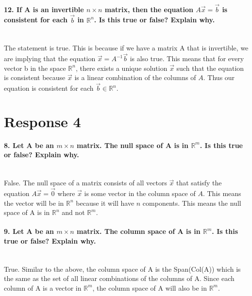 \documentclass{report}
\begin{document}
\paragraph{12. If A is an invertible $ n \times n $ matrix, then the equation $ A \vec{ x }= \vec{ b } $ is consistent for each $ \vec{ b }  $ in $ \mathbb{R}^{ n } $. Is this true or false? Explain why. \\ \\}
The statement is true. This is because if we have a matrix A that is invertible, we are implying that the equation $ \vec{ x } = A^{ -1 }\vec{ b } $ is also true. This means that for every vector b in the space $ \mathbb{R}^{ n } $, there exists a unique solution $ \vec{ x } $ such that the equation is consistent because $ \vec{ x } $ is a linear combination of the columns of $ A $. Thus our equation is consistent for each $ \vec{ b } \in \mathbb{R}^{ n }$.

\section{Response 4}%
\label{sec: Response 4 }
\paragraph{8. Let A be an $ m \times n $ matrix. The null space of A is in $ \mathbb{R}^{ m } $. Is this true or false? Explain why. \\ \\}
False. The null space of a matrix consists of all vectors $ \vec{ x } $ that satisfy the equation $ A \vec{ x } = \vec{ 0 } $ where $ \vec{ x } $ is some vector in the column space of $ A $. This means the vector will be in $ \mathbb{R}^{ n } $ because it will have $ n $ components. This means the null space of A is in $ \mathbb{R}^{ n } $ and not $ \mathbb{R}^{ m } $. 
\paragraph{9. Let A be an $ m \times n $ matrix. The column space of A is in $ \mathbb{R}^{ m } $. Is this true or false? Explain why. \\ \\}
True. Similar to the above, the column space of A is the Span(Col(A)) which is the same as the set of all linear combinations of the columns of A. Since each column of A is a vector in $ \mathbb{R}^{ m } $, the column space of A will also be in $ \mathbb{R}^{ m }$. 
\end{document}
